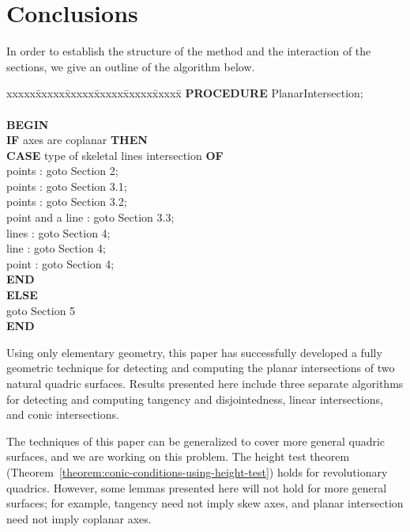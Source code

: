 \section{Conclusions}
\label{section:conclusion}
     In order to establish the structure of the method and the interaction
of the sections, we give an outline of the algorithm below.

\vspace{1cm}
\begin{minipage}{5in}
{\small
\begin{tabbing}
     xxxxx\=xxxxx\=xxxxx\=xxxxx\=xxxxx\=xxxxx\=\kill
     \> {\bf PROCEDURE} PlanarIntersection; \\
     \> \\
     \> {\bf BEGIN} \\
     \>\> {\bf IF} axes are coplanar {\bf THEN} \\
     \>\>\> {\bf CASE} type of skeletal lines intersection {\bf OF} \\
     \>\>\> points : goto Section 2; \\
     \>\>\> points : goto Section 3.1; \\
     \>\>\> points : goto Section 3.2; \\
     \>\>\> point and a line : goto Section 3.3; \\
     \>\>\> lines : goto Section 4; \\
     \>\>\> line  : goto Section 4; \\
     \>\>\> point : goto Section 4; \\
     \>\>\> {\bf END} \\
     \>\> {\bf ELSE} \\
     \>\>\>  goto Section 5 \\
     \> {\bf END} \\
\end{tabbing}
}
\end{minipage}

     Using only elementary geometry, this paper has successfully developed a 
fully geometric technique for detecting and computing the planar intersections
of two natural quadric surfaces.  Results presented here include three 
separate algorithms for detecting and computing tangency and disjointedness, 
linear intersections, and conic intersections.  

     The techniques of this paper can be generalized to cover more general 
quadric surfaces, and we are working on this problem.  The height test theorem 
(Theorem~\ref{theorem:conic-conditions-using-height-test}) holds for 
revolutionary quadrics.  However, some lemmas presented here will not hold for
more general surfaces; for example, tangency need not imply skew axes, and 
planar intersection need not imply coplanar axes.

